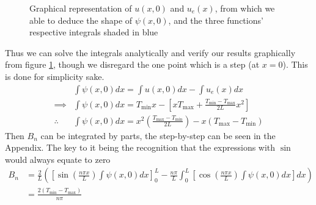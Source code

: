 \begin{figure}[h]

\caption{Graphical representation of $u(x,0)$ and $u_e(x)$, from which we able to deduce the shape of $\psi(x,0)$, and the three functions' respective integrals shaded in blue}
\label{gr:Integrals-of-u-ue-psi}
\end{figure}

Thus we can solve the integrals analytically and verify our results graphically from figure \ref{gr:Integrals-of-u-ue-psi}, though we disregard the one point which is a step (at $x=0$). 
This is done for simplicity sake.
\begin{equation*}
\begin{split}
    &\int \psi(x,0)dx = \int u(x,0) dx - \int u_e(x) dx \\
    \implies &\int \psi(x,0)dx = T_{\min}x - \left[ xT_{\max} + \frac{ T_{\min} -T_{\max} }{2L}x^2 \right] \\
    \therefore &\int \psi(x,0)dx = x^2 \left( \frac{ T_{\max}-T_{\min} }{2L} \right) -x (T_{\max}-T_{\min})
\end{split}
\end{equation*}
Then $B_n$ can be integrated by parts, the step-by-step can be seen in the Appendix. 
The key to it being the recognition that the expressions with $\sin$ would always equate to zero
\begin{equation*}
\begin{split}
    B_n &= \frac{2}{L} \left( \left[ \sin\left( \frac{n\pi x}{L}\right) \int \psi(x,0)dx \right]^L_0 - \frac{n\pi}{L}\int_0^L \left[ \cos\left( \frac{n\pi x}{L}\right) \int \psi(x,0)dx \right] dx \right) \\
    &= \frac{	2( T_{\min} - T_{\max} )	}{	n\pi	}
\end{split}
\end{equation*}

